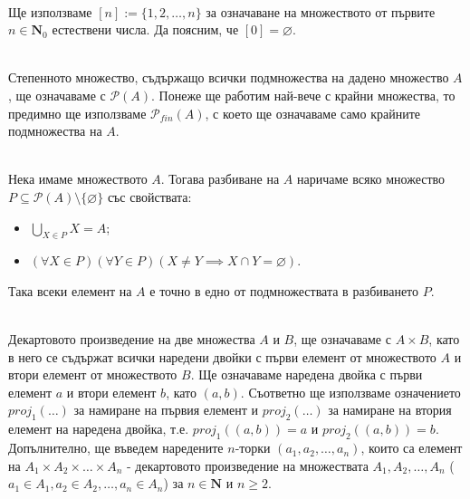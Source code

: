 \documentclass[12pt,twoside,a4paper]{article}
\begin{document}
	\begin{denotation}~\\
		\indent Ще използваме $[n]:=\{1, 2, \dots, n\}$ за означаване на множеството от първите $n \in \mathbf{N}_0$ естествени числа. Да поясним, че $[0]=\varnothing$.
	\end{denotation}
	
	\begin{denotation}~\\
		\indent Степенното множество, съдържащо всички подмножества на дадено множество $A$, ще означаваме с $\mathcal{P}(A)$. Понеже ще работим най-вече с крайни множества, то предимно ще използваме $\mathcal{P}_{fin}(A)$, с което ще означаваме само крайните подмножества на $A$.
	\end{denotation}
	
	\begin{definition}~\\
		\indent Нека имаме множеството $A$. Тогава разбиване на $A$ наричаме всяко множество $P \subseteq \mathcal{P}(A) \setminus \{\varnothing\}$ със свойствата:
		\begin{itemize}
			\item $\bigcup_{X \in P}X = A$;
			\item $(\forall X \in P)(\forall Y \in P)(X \neq Y \implies X \cap Y = \varnothing)$.
		\end{itemize}
		Така всеки елемент на $A$ е точно в едно от подмножествата в разбиването $P$.
	\end{definition}
	
	\begin{denotations}~\\
		\indent Декартовото произведение на две множества $A$ и $B$, ще означаваме с $A \times B$, като в него се съдържат всички наредени двойки с първи елемент от множеството $A$ и втори елемент от множеството $B$. Ще означаваме наредена двойка с първи елемент $a$ и втори елемент $b$, като $(a,b)$. Съответно ще използваме означението $proj_1(\dots)$ за намиране на първия елемент и $proj_2(\dots)$ за намиране на втория елемент на наредена двойка, т.е. $proj_1((a,b))=a$ и $proj_2((a,b))=b$. Допълнително, ще въведем наредените $n$-торки $(a_1, a_2, \dots, a_n)$, които са елемент на $A_1 \times A_2 \times \dots \times A_n$ - декартовото произведение на множествата $A_1, A_2, \dots, A_n$ ($a_1 \in A_1, a_2 \in A_2, \dots, a_n \in A_n$) за $n \in \mathbf{N}$ и $n \ge 2$.
	\end{denotations}
	
\end{document}
